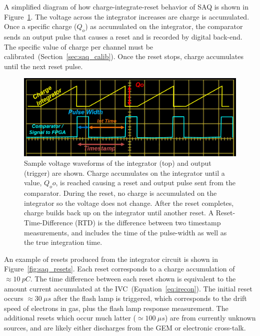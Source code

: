 A simplified diagram of how charge-integrate-reset behavior of SAQ is shown in Figure~\ref{fig:saq_reconstruction}.
The voltage across the integrator increases are charge is accumulated.
Once a specific charge ($Q_{o}$) as accumulated on the integrator, the comparator sends an output pulse that causes a reset and is recorded by digital back-end.
The specific value of charge per channel must be calibrated~(Section~\ref{sec:saq_calib}).
Once the reset stops, charge accumulates until the next reset pulse.

\begin{figure}[]
\centering
\includegraphics[width=\textwidth]{images/saq_example_reconstruction.png}
\caption{Sample voltage waveforms of the integrator (top) and output (trigger) are shown.
Charge accumulates on the integrator until a value, $Q_o{o}$, is reached causing a reset and output pulse sent from the comparator.
During the reset, no charge is accumulated on the integrator so the voltage does not change.
After the reset completes, charge builds back up on the integrator until another reset.
A Reset-Time-Difference (RTD) is the difference between two timestamp measurements, and includes the time of the pulse-width as well as the true integration time.
}
\label{fig:saq_reconstruction}
\end{figure}

An example of resets produced from the integrator circuit is shown in Figure~\ref{fig:saq_resets}.
Each reset corresponds to a charge accumulation of $\approx 10~\unit{pC}$.
The time difference between each reset shown is equivalent to the amount current accumulated at the IVC~(Equation~\ref{eq:irecon}).
The initial reset occurs $\approx 30~\unit{\mu s}$ after the flash lamp is triggered, which corresponds to the drift speed of electrons in gas, plus the flash lamp response measurement.
The additional resets which occur much latter ($\simeq 100~\unit{\mu s}$) are from currently unknown sources, and are likely either discharges from the GEM or electronic cross-talk.

